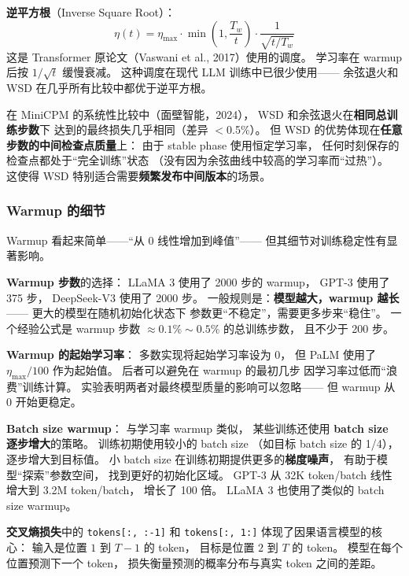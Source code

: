 \textbf{逆平方根}（Inverse Square Root）：
\begin{equation}
  \eta(t) = \eta_{\max} \cdot \min\left(1, \frac{T_w}{t}\right) \cdot \frac{1}{\sqrt{t / T_w}}
\end{equation}
这是 Transformer 原论文（Vaswani et al., 2017）使用的调度。
学习率在 warmup 后按 $1/\sqrt{t}$ 缓慢衰减。
这种调度在现代 LLM 训练中已很少使用——
余弦退火和 WSD 在几乎所有比较中都优于逆平方根。

在 MiniCPM 的系统性比较中（面壁智能，2024），
WSD 和余弦退火在\textbf{相同总训练步数}下
达到的最终损失几乎相同（差异 $<$0.5\%）。
但 WSD 的优势体现在\textbf{任意步数的中间检查点质量}上：
由于 stable phase 使用恒定学习率，
任何时刻保存的检查点都处于``完全训练''状态
（没有因为余弦曲线中较高的学习率而``过热''）。
这使得 WSD 特别适合需要\textbf{频繁发布中间版本}的场景。

\subsubsection{Warmup 的细节}

Warmup 看起来简单——``从 0 线性增加到峰值''——
但其细节对训练稳定性有显著影响。

\textbf{Warmup 步数}的选择：
LLaMA 3 使用了 2000 步的 warmup，
GPT-3 使用了 375 步，
DeepSeek-V3 使用了 2000 步。
一般规则是：\textbf{模型越大，warmup 越长}——
更大的模型在随机初始化状态下
参数更``不稳定''，需要更多步来``稳住''。
一个经验公式是 warmup 步数 $\approx 0.1\% \sim 0.5\%$ 的总训练步数，
且不少于 200 步。

\textbf{Warmup 的起始学习率}：
多数实现将起始学习率设为 0，
但 PaLM 使用了 $\eta_{\max}/100$ 作为起始值。
后者可以避免在 warmup 的最初几步
因学习率过低而``浪费''训练计算。
实验表明两者对最终模型质量的影响可以忽略——
但 warmup 从 0 开始更稳定。

\textbf{Batch size warmup}：
与学习率 warmup 类似，
某些训练还使用 \textbf{batch size 逐步增大}的策略。
训练初期使用较小的 batch size
（如目标 batch size 的 1/4），
逐步增大到目标值。
小 batch size 在训练初期提供更多的\textbf{梯度噪声}，
有助于模型``探索''参数空间，
找到更好的初始化区域。
GPT-3 从 32K token/batch 线性增大到 3.2M token/batch，
增长了 100 倍。
LLaMA 3 也使用了类似的 batch size warmup。

\textbf{交叉熵损失}中的 \texttt{tokens[:, :-1]} 和
\texttt{tokens[:, 1:]} 体现了因果语言模型的核心：
输入是位置 $1$ 到 $T-1$ 的 token，
目标是位置 $2$ 到 $T$ 的 token。
模型在每个位置预测下一个 token，
损失衡量预测的概率分布与真实 token 之间的差距。

